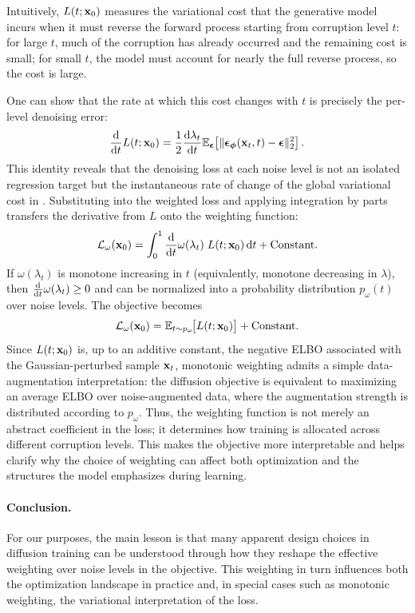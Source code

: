 Intuitively, $L(t;{\mathbf{x}}_0)$ measures the variational cost that the
generative model incurs when it must reverse the forward process
starting from corruption level $t$: for large $t$, much of the
corruption has already occurred and the remaining cost is small; for
small $t$, the model must account for nearly the full reverse process,
so the cost is large.

One can show that the rate at which this cost changes with $t$ is
precisely the per-level denoising error:
\[
\frac{\mathop{}\!\mathrm{d}}{\mathop{}\!\mathrm{d} t}L(t;{\mathbf{x}}_0)
=
\frac{1}{2}\frac{\mathop{}\!\mathrm{d}\lambda_t}{\mathop{}\!\mathrm{d} t} 
\mathbb{E}_{{\bm{\epsilon}}}\!\left[
\|{\bm{\epsilon}}_{\bm{\phi}}({\mathbf{x}}_t,t)-{\bm{\epsilon}}\|_2^2
\right].
\]
This identity reveals that the denoising loss at each noise level is
not an isolated regression target but the instantaneous rate of change
of the global variational cost in .
Substituting into the weighted loss and applying integration by parts
transfers the derivative from $L$ onto the weighting function:
\[
\mathcal{L}_\omega({\mathbf{x}}_0)
=
\int_0^1
\frac{\mathop{}\!\mathrm{d}}{\mathop{}\!\mathrm{d} t} \omega(\lambda_t)\;
L(t;{\mathbf{x}}_0) \mathop{}\!\mathrm{d} t
+ \text{Constant}.
\]
If $\omega(\lambda_t)$ is monotone increasing in $t$ (equivalently, monotone
decreasing in $\lambda$), then
$\frac{\mathop{}\!\mathrm{d}}{\mathop{}\!\mathrm{d} t} \omega(\lambda_t)\ge 0$ and can be normalized into a
probability distribution $p_\omega(t)$ over noise levels. The objective
becomes
\[
\mathcal{L}_\omega({\mathbf{x}}_0)
=
\mathbb{E}_{t\sim p_\omega}\!\big[L(t;{\mathbf{x}}_0)\big]+ \text{Constant}.
\]
Since $L(t;{\mathbf{x}}_0)$ is, up to an additive constant, the negative ELBO
associated with the Gaussian-perturbed sample ${\mathbf{x}}_t$, monotonic
weighting admits a simple data-augmentation interpretation: the
diffusion objective is equivalent to maximizing an average ELBO over
noise-augmented data, where the augmentation strength is distributed
according to $p_\omega$. Thus, the
weighting function is not merely an abstract coefficient in the loss; it
determines how training is allocated across different corruption levels.
This makes the objective more interpretable and helps clarify why the
choice of weighting can affect both optimization and the structures the
model emphasizes during learning.


\paragraph{Conclusion.}
For our purposes, the main lesson is that many apparent design choices
in diffusion training can be understood through how they reshape the
effective weighting over noise levels in the objective. This weighting
in turn influences both the optimization landscape in practice and, in
special cases such as monotonic weighting, the variational
interpretation of the loss.




